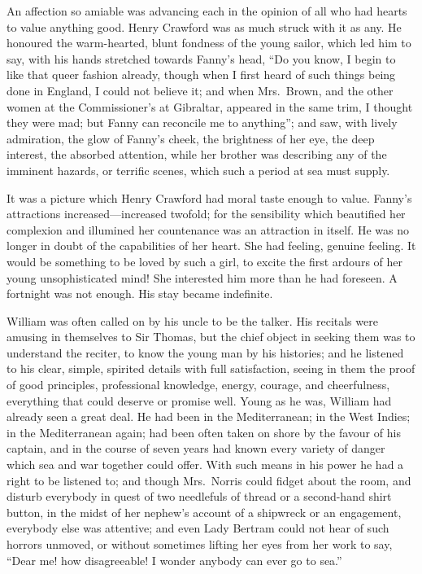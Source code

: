 \documentclass{article}
\begin{document}
An affection so amiable was advancing each in the opinion
of all who had hearts to value anything good.  Henry Crawford
was as much struck with it as any.  He honoured the
warm-hearted, blunt fondness of the young sailor, which led
him to say, with his hands stretched towards Fanny's head,
``Do you know, I begin to like that queer fashion already,
though when I first heard of such things being done
in England, I could not believe it; and when Mrs.\ Brown,
and the other women at the Commissioner's at Gibraltar,
appeared in the same trim, I thought they were mad; but Fanny
can reconcile me to anything''; and saw, with lively admiration,
the glow of Fanny's cheek, the brightness of her eye,
the deep interest, the absorbed attention, while her
brother was describing any of the imminent hazards,
or terrific scenes, which such a period at sea must supply.

It was a picture which Henry Crawford had moral taste enough
to value.  Fanny's attractions increased---increased twofold;
for the sensibility which beautified her complexion and
illumined her countenance was an attraction in itself.
He was no longer in doubt of the capabilities of her heart.
She had feeling, genuine feeling.  It would be something
to be loved by such a girl, to excite the first ardours
of her young unsophisticated mind!  She interested him
more than he had foreseen.  A fortnight was not enough.
His stay became indefinite.

William was often called on by his uncle to be the talker.
His recitals were amusing in themselves to Sir Thomas,
but the chief object in seeking them was to understand
the reciter, to know the young man by his histories;
and he listened to his clear, simple, spirited details with
full satisfaction, seeing in them the proof of good principles,
professional knowledge, energy, courage, and cheerfulness,
everything that could deserve or promise well.
Young as he was, William had already seen a great deal.
He had been in the Mediterranean; in the West Indies;
in the Mediterranean again; had been often taken on shore
by the favour of his captain, and in the course of seven
years had known every variety of danger which sea and war
together could offer.  With such means in his power he
had a right to be listened to; and though Mrs.\ Norris could
fidget about the room, and disturb everybody in quest
of two needlefuls of thread or a second-hand shirt button,
in the midst of her nephew's account of a shipwreck
or an engagement, everybody else was attentive; and even
Lady Bertram could not hear of such horrors unmoved,
or without sometimes lifting her eyes from her work to say,
``Dear me! how disagreeable!  I wonder anybody can ever go
to sea.''
\end{document}
